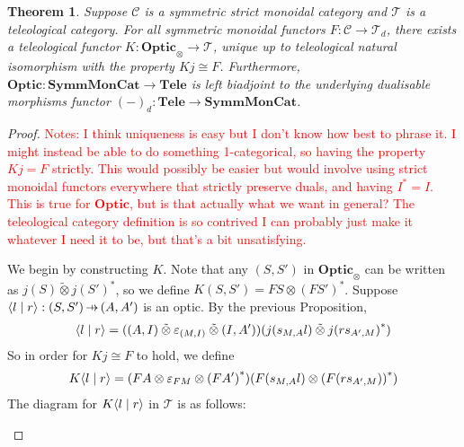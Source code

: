 \documentclass[11pt,letterpaper]{article}
\theoremstyle{plain}
\newtheorem{theorem}{Theorem}[subsection]
\theoremstyle{definition}
\newcommand{\C}{\mathscr{C}}
\newcommand{\T}{\mathscr{T}}
\newcommand{\SymmMonCat}{\mathbf{SymmMonCat}}
\newcommand{\Tele}{\mathbf{Tele}}
\newcommand{\Optic}{\mathbf{Optic}}
\newcommand{\switched}{\mathbin{\tilde{\otimes}}}
\newcommand{\rep}[2]{{\ensuremath \left\langle #1 \mid #2 \right\rangle}}
\newcommand{\hto}{\ensuremath{\,\mathaccent\shortmid\rightarrow\,}}
\newcommand{\todo}[1]{\textcolor{red}{\small #1}}
\begin{document}
\begin{theorem}\label{optic-is-free-teleological-cat}
  Suppose $\C$ is a symmetric strict monoidal category and $\T$ is a teleological category. For all symmetric monoidal functors $F : \C \to \T_d$, there exists a teleological functor $K : \Optic_\otimes \to \T$, unique up to teleological natural isomorphism with the property $Kj \cong F$.
  Furthermore, $\Optic : \SymmMonCat \to \Tele$ is left biadjoint to the underlying dualisable morphisms functor ${(-)}_d : \Tele \to \SymmMonCat$.
\end{theorem}
\begin{proof}
  \todo{Notes: I think uniqueness is easy but I don't know how best to phrase it. I might instead be able to do something 1-categorical, so having the property $Kj = F$ strictly. This would possibly be easier but would involve using strict monoidal functors everywhere that strictly preserve duals, and having $I^* = I$. This is true for $\Optic$, but is that actually what we want in general? The teleological category definition is so contrived I can probably just make it whatever I need it to be, but that's a bit unsatisfying.}

  We begin by constructing $K$. Note that any $(S, S')$ in $\Optic_\otimes$ can be written as $j(S) \switched {j(S')}^*$, so we define $K(S, S') = FS \otimes {(FS')}^*$. Suppose $\rep{l}{r} : (S, S') \hto (A, A')$ is an optic. By the previous Proposition,
  \begin{align*}
    \rep{l}{r} = ((A, I) \switched \varepsilon_{(M, I)} \switched (I, A'))(j(s_{M,A}l) \switched {j(rs_{A', M})}^*)
  \end{align*}
  So in order for $Kj \cong F$ to hold, we define
  \begin{align*}
    K\rep{l}{r} = (FA \otimes \varepsilon_{FM} \otimes {(FA')}^*)(F(s_{M,A}l) \otimes {(F(rs_{A', M}))}^* )
  \end{align*}
  The diagram for $K\rep{l}{r}$ in $\T$ is as follows:
  \begin{center}
    
  \end{center}


\end{proof}
\end{document}
